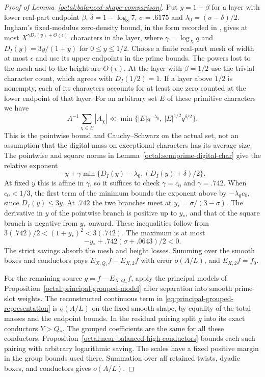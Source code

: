 \documentclass[11pt,a4paper]{article}
\theoremstyle{paperplain}
\numberwithin{equation}{section}
\begin{document}
\begin{proof}[Proof of Lemma~\ref{octal:balanced-shape-comparison}]
Put $y=1-\beta$ for a layer with lower real-part endpoint $\beta$,
$\delta=1-\log_8 7$, $\sigma=.6175$ and $\lambda_0=(\sigma-\delta)/2$.
Ingham's fixed-modulus zero-density bound, in the form recorded in
\cite[(1.4)]{ChenGuptaLi2026}, gives at most
$X^{\gamma D_I(y)+O(\epsilon)}$ characters in the layer, where
$\gamma=\log_X q$ and $D_I(y)=3y/(1+y)$ for $0\le y\le1/2$.
Choose a finite real-part mesh of width at most $\epsilon$ and use its
upper endpoints in the prime bounds. The powers lost to the mesh and
to the height are $O(\epsilon)$. At the layer
with $\beta=1/2$ use the trivial character count, which agrees
with $D_I(1/2)=1$. If a layer above $1/2$ is nonempty, each of its characters accounts
for at least one zero counted at the lower endpoint of that layer.
For an arbitrary set $E$ of these primitive characters we have
\[
 A^{-1}\sum_{\chi\in E}|A_\chi|
 \ll\min\{|E|q^{-\lambda_0},\ |E|^{1/2}q^{\delta/2}\}.
\]
This is the pointwise bound and Cauchy--Schwarz on the actual set, not
an assumption that the digital mass on exceptional characters has its
average size. The pointwise and square norms in
Lemma~\ref{octal:semiprime-digital-char} give the relative exponent
\[
 -y+\gamma\min\{D_I(y)-\lambda_0,(D_I(y)+\delta)/2\}.
\]
At fixed $y$ this is affine in $\gamma$, so it suffices to check
$\gamma=c_0$ and $\gamma=.742$. When $c_0<1/3$, the first term
of the minimum bounds the exponent above by $-\lambda_0c_0$,
since $D_I(y)\le3y$. At $.742$ the two branches meet at
$y_*=\sigma/(3-\sigma)$. The derivative in $y$ of the pointwise
branch is positive up to $y_*$, and that of the square branch
is negative from $y_*$ onward. These inequalities follow from
$3(.742)/2<(1+y_*)^2<3(.742)$. The maximum is at most
\[
    -y_*+.742(\sigma+.0643)/2<0.
\]
The strict savings absorb the mesh and height losses. Summing
over the smooth boxes and conductors pays $E_{X,Q_*}f-E_{X,2}f$
with error $o(A/L)$, and $E_{X,2}f=f_0$.

For the remaining source $g=f-E_{X,Q_*}f$, apply the principal models
of Proposition~\ref{octal:principal-grouped-model} after separation
into smooth prime-slot weights. The reconstructed continuous term in
\eqref{eq:principal-grouped-representation} is $o(A/L)$ on the fixed
smooth shape, by equality of the total masses and the endpoint bounds.
In the residual pairing split $g$ into its exact conductors $Y>Q_*$.
The grouped coefficients are the same for all these conductors.
Proposition~\ref{octal:near-balanced-high-conductors} bounds each such
pairing with arbitrary logarithmic saving. The scales have a fixed
positive margin in the group bounds used there. Summation over all
retained twists, dyadic boxes, and conductors gives $o(A/L)$.


\end{proof}
\end{document}
